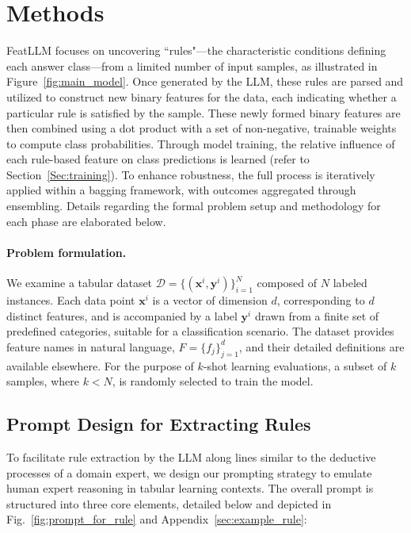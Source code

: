 \section{Methods}
\textsf{FeatLLM} focuses on uncovering ``rules"—the characteristic conditions defining each answer class—from a limited number of input samples, as illustrated in Figure~\ref{fig:main_model}. Once generated by the LLM, these rules are parsed and utilized to construct new binary features for the data, each indicating whether a particular rule is satisfied by the sample. These newly formed binary features are then combined using a dot product with a set of non-negative, trainable weights to compute class probabilities. Through model training, the relative influence of each rule-based feature on class predictions is learned (refer to Section~\ref{Sec:training}). To enhance robustness, the full process is iteratively applied within a bagging framework, with outcomes aggregated through ensembling. Details regarding the formal problem setup and methodology for each phase are elaborated below.

\vspace*{-0.12in}
\paragraph{Problem formulation.} We examine a tabular dataset $\mathcal{D} = \{(\mathbf{x}^i, \mathbf{y}^i)\}_{i=1}^{N}$ composed of $N$ labeled instances. Each data point $\mathbf{x}^i$ is a vector of dimension $d$, corresponding to $d$ distinct features, and is accompanied by a label $\mathbf{y}^i$ drawn from a finite set of predefined categories, suitable for a classification scenario. The dataset provides feature names in natural language, $F = \{f_j\}_{j=1}^{d}$, and their detailed definitions are available elsewhere. For the purpose of $k$-shot learning evaluations, a subset of $k$ samples, where $k < N$, is randomly selected to train the model.

\subsection{Prompt Design for Extracting Rules}
\label{Sec:prompt_design}
To facilitate rule extraction by the LLM along lines similar to the deductive processes of a domain expert, we design our prompting strategy to emulate human expert reasoning in tabular learning contexts. The overall prompt is structured into three core elements, detailed below and depicted in Fig.~\ref{fig:prompt_for_rule} and Appendix~\ref{sec:example_rule}:

